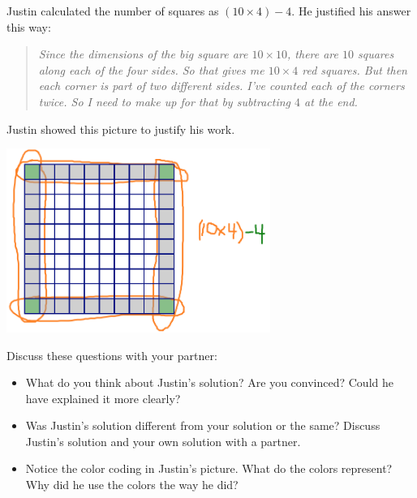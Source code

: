 \bigskip

\newpage

Justin calculated the number of squares as $(10 \times 4) - 4$.  He justified his answer this way:
\begin{quotation}
\emph{Since the dimensions of the big square are $10 \times 10$, there are $10$ squares along each of the four sides.  So that gives me $10 \times 4$ red squares.  But then each corner is part of two different sides.  I've counted each of the corners twice.  So I need to make up for that by subtracting $4$ at the end.}
\end{quotation}

Justin showed this picture to justify his work.
\begin{center}
\includegraphics[height=6cm]{border2}
\end{center}

\bigskip
\bigskip


\begin{thinkpair*}
Discuss these questions with your partner:
\begin{itemize}
\item
What do you think about Justin's solution?  Are you convinced?  Could he have explained it more clearly?\\

\item
Was Justin's solution different from your solution or the same?  Discuss Justin's solution and your own solution with a partner.\\

\item
Notice the color coding in Justin's picture.  What do the colors represent?  Why did he use the colors the way he did?\\
\end{itemize}
\end{thinkpair*}

\newpage

